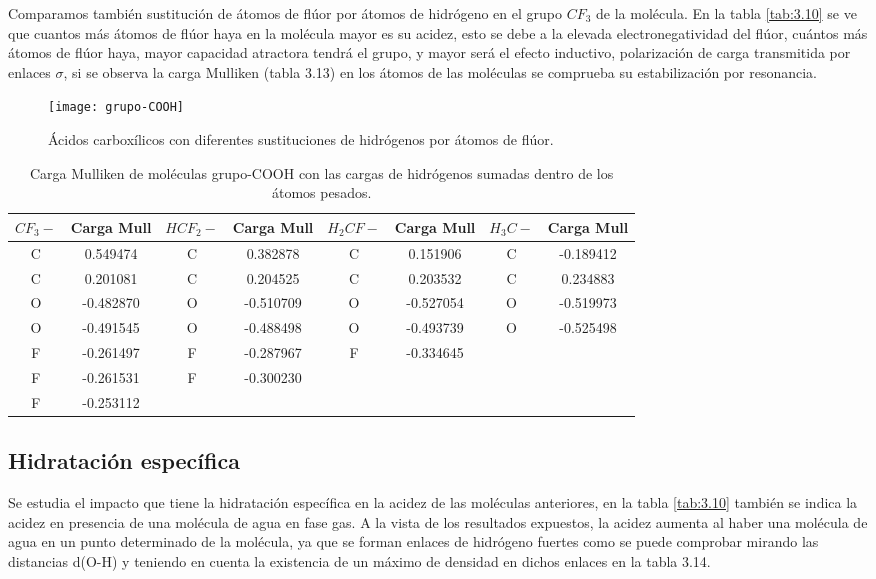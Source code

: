 Comparamos también sustitución de átomos de flúor por átomos de hidrógeno en el grupo $CF_3$ de la molécula. En la tabla \ref{tab:3.10} se ve que cuantos más átomos de flúor haya en la molécula mayor es su acidez, esto se debe a la elevada electronegatividad del flúor, cuántos más átomos de flúor haya, mayor capacidad atractora tendrá el grupo, y mayor será el efecto inductivo, polarización de carga transmitida por enlaces $\sigma$, si se observa la carga Mulliken (tabla 3.13) en los átomos de las moléculas se comprueba su estabilización por resonancia.

\begin{figure}[H]
	\centering
	\texttt{[image: grupo-COOH]}
	\caption{Ácidos carboxílicos con diferentes sustituciones de hidrógenos por átomos de flúor.}
\end{figure}
\begin{table}[H]
    \centering
    \begin{tabular}{|c|c|c|c|c|c|c|c|}
    \hline
    $CF_3-$ & Carga Mull & $HCF_2-$ & Carga Mull & $H_2CF-$ & Carga Mull & $H_3C-$ & Carga Mull \\ \hline
     C & 0.549474 &  C & 0.382878 & C & 0.151906 & C & -0.189412 \\ \hline
     C & 0.201081 &  C & 0.204525 & C & 0.203532 & C & 0.234883 \\ \hline
     O & -0.482870 & O & -0.510709 & O & -0.527054 & O & -0.519973 \\ \hline
     O & -0.491545 & O & -0.488498 &  O & -0.493739 & O & -0.525498 \\ \hline
     F & -0.261497 & F & -0.287967 & F & -0.334645 &  & \\ \hline
     F & -0.261531 & F & -0.300230 &  &  &  & \\ \hline
     F & -0.253112 &  &  &  &  &  & \\ \hline
    \end{tabular}
    \caption{Carga Mulliken de moléculas grupo-COOH con las cargas de hidrógenos sumadas dentro de los átomos pesados.}
\end{table}

\subsection{Hidratación específica}
Se estudia el impacto que tiene la hidratación específica en la acidez de las moléculas anteriores, en la tabla \ref{tab:3.10} también se indica la acidez en presencia de una molécula de agua en fase gas.
A la vista de los resultados expuestos, la acidez aumenta al haber una molécula de agua en un punto determinado de la molécula, ya que se forman enlaces de hidrógeno fuertes como se puede comprobar mirando las distancias d(O-H) y teniendo en cuenta la existencia de un máximo de densidad en dichos enlaces en la tabla 3.14. 

